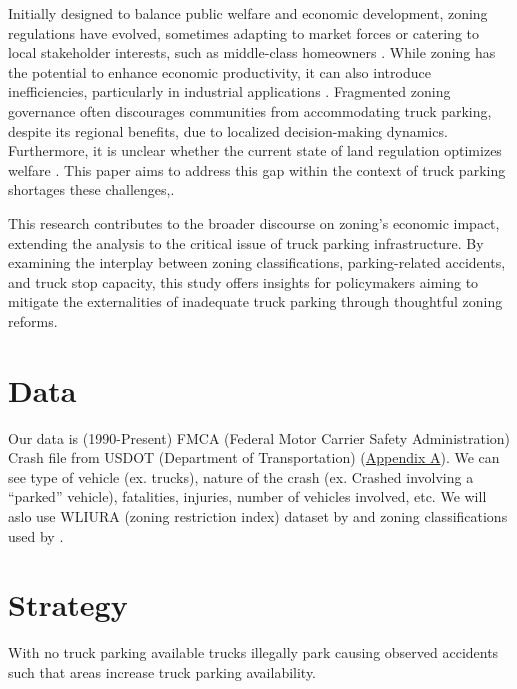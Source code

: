 \documentclass[
  12pt]{article}
\begin{document}
Initially designed to balance public welfare and economic development,
zoning regulations have evolved, sometimes adapting to market forces or
catering to local stakeholder interests, such as middle-class homeowners
\citep{fischelEconomicHistoryZoning2024}. While zoning has the potential
to enhance economic productivity, it can also introduce inefficiencies,
particularly in industrial applications
\citep{mcdonaldPDFEconomicsZoning2012}. Fragmented zoning governance
often discourages communities from accommodating truck parking, despite
its regional benefits, due to localized decision-making dynamics.
Furthermore, it is unclear whether the current state of land regulation
optimizes welfare \citep{osmanRestrictiveLandUse2020}. This paper aims
to address this gap within the context of truck parking shortages these
challenges,.

This research contributes to the broader discourse on zoning's economic
impact, extending the analysis to the critical issue of truck parking
infrastructure. By examining the interplay between zoning
classifications, parking-related accidents, and truck stop capacity,
this study offers insights for policymakers aiming to mitigate the
externalities of inadequate truck parking through thoughtful zoning
reforms.

\section{Data}\label{data}

Our data is (1990-Present) FMCA (Federal Motor Carrier Safety
Administration) Crash file from USDOT (Department of Transportation)
(\label{sec:appendix-a}\hyperref[sec-a.-visualization-of-dataset.-]{Appendix
A}). We can see type of vehicle (ex. trucks), nature of the crash (ex.
Crashed involving a ``parked'' vehicle), fatalities, injuries, number of
vehicles involved, etc. We will aslo use WLIURA (zoning restriction
index) dataset by \citet{gyourkoNewMeasureLocal2008} and zoning
classifications used by \citet{puentesTraditionalReformedReview2006} .

\section{\texorpdfstring{\textbf{Strategy}}{Strategy}}\label{strategy}

With no truck parking available trucks illegally park causing observed
accidents such that areas increase truck parking availability.
\end{document}
